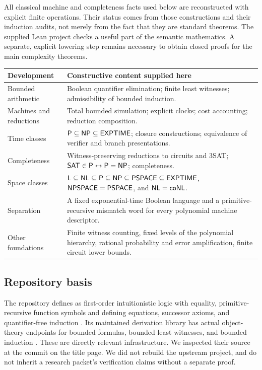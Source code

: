 All classical machine and completeness facts used below are reconstructed with
explicit finite operations. Their \ipra{} status comes from those constructions
and their induction audits, not merely from the fact that they are standard
theorems. The supplied Lean project checks a useful part of the semantic
mathematics. A separate, explicit lowering step remains necessary to obtain
closed  proofs for the main complexity theorems.

\begin{center}
\begin{tabularx}{\textwidth}{@{}p{}X@{}}
\toprule
Development & Constructive content supplied here\\
\midrule
Bounded arithmetic & Boolean quantifier elimination; finite least witnesses;
admissibility of bounded induction.\\
Machines and reductions & Total bounded simulation; explicit clocks; cost
accounting; reduction composition.\\
Time classes & \(\mathsf P\subseteq\mathsf{NP}\subseteq\mathsf{EXPTIME}\); closure constructions;
equivalence of verifier and branch presentations.\\
Completeness & Witness-preserving reductions to circuits and 3SAT;
\(\mathsf{SAT}\in\mathsf P\leftrightarrow\mathsf P=\mathsf{NP}\); \QBF{} completeness.\\
Space classes & \(\mathsf L\subseteq\mathsf{NL}\subseteq\mathsf P\subseteq\mathsf{NP}
\subseteq\mathsf{PSPACE}\subseteq\mathsf{EXPTIME}\), \(\mathsf{NPSPACE}=\mathsf{PSPACE}\), and
\(\mathsf{NL}=\mathsf{coNL}\).\\
Separation & A fixed exponential-time Boolean language and a primitive-recursive
mismatch word for every polynomial machine descriptor.\\
Other foundations & Finite witness counting, fixed levels of the polynomial
hierarchy, rational probability and error amplification, finite circuit lower
bounds.\\
\bottomrule
\end{tabularx}
\end{center}

\subsection{Repository basis}

The repository defines \ipra{} as first-order intuitionistic logic with equality,
primitive-recursive function symbols and defining equations, successor axioms,
and quantifier-free induction \cite{ProveItPR}. Its maintained derivation
library has actual object-theory endpoints for bounded formulas, bounded least
witnesses, and bounded induction \cite{ProveItBounded,ProveItLeast,ProveItInd}.
These are directly relevant infrastructure. We inspected their source at the
commit on the title page. We did not rebuild the upstream project, and do not
inherit a research packet's verification claims without a separate proof.

